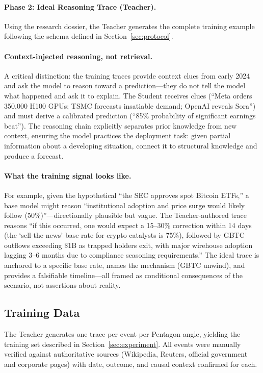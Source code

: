 \documentclass[11pt,a4paper]{article}
\begin{document}
\paragraph{Phase 2: Ideal Reasoning Trace (Teacher).}
Using the research dossier, the Teacher generates the complete training example following the schema defined in Section~\ref{sec:protocol}.

\paragraph{Context-injected reasoning, not retrieval.}
A critical distinction: the training traces provide context clues from early 2024 and ask the model to reason toward a prediction---they do not tell the model what happened and ask it to explain. The Student receives clues (``Meta orders 350,000 H100 GPUs; TSMC forecasts insatiable demand; OpenAI reveals Sora'') and must derive a calibrated prediction (``85\% probability of significant earnings beat''). The reasoning chain explicitly separates prior knowledge from new context, ensuring the model practices the deployment task: given partial information about a developing situation, connect it to structural knowledge and produce a forecast.

\paragraph{What the training signal looks like.}
For example, given the hypothetical ``the SEC approves spot Bitcoin ETFs,'' a base model might reason ``institutional adoption and price surge would likely follow (50\%)''---directionally plausible but vague. The Teacher-authored trace reasons ``if this occurred, one would expect a 15--30\% correction within 14 days (the `sell-the-news' base rate for crypto catalysts is 75\%), followed by GBTC outflows exceeding \$1B as trapped holders exit, with major wirehouse adoption lagging 3--6 months due to compliance seasoning requirements.'' The ideal trace is anchored to a specific base rate, names the mechanism (GBTC unwind), and provides a falsifiable timeline---all framed as conditional consequences of the scenario, not assertions about reality.

\subsection{Training Data}

The Teacher generates one trace per event per Pentagon angle, yielding the training set described in Section~\ref{sec:experiment}. All events were manually verified against authoritative sources (Wikipedia, Reuters, official government and corporate pages) with date, outcome, and causal context confirmed for each.
\end{document}
